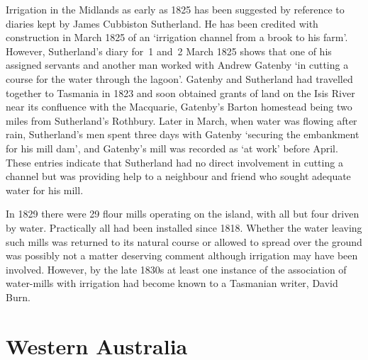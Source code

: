 Irrigation in the Midlands as early as 1825 has been suggested by
reference to diaries kept by James Cubbiston Sutherland. He has been
credited with construction in March 1825 of an `irrigation channel
from a brook to his farm'. However, Sutherland's diary for~1
and~2 March 1825 shows that one of his assigned servants and another
man worked with Andrew Gatenby `in cutting a course for the water
through the lagoon'.  Gatenby and Sutherland had travelled together to
Tasmania in 1823 and soon obtained grants of land on the Isis River
near its confluence with the Macquarie, Gatenby's Barton homestead
being two miles from Sutherland's
Rothbury.  Later in March, when water was flowing after rain,
Sutherland's men spent three days with Gatenby `securing the
embankment for his mill dam', and Gatenby's mill was recorded as `at
work' before April.  These entries indicate that Sutherland had no
direct involvement in cutting a channel but was providing help to a
neighbour and friend who sought adequate water for his
mill.

In 1829 there were 29 flour mills operating on the island, with all
but four driven by water.  Practically all had been installed since
1818.  Whether the water leaving such mills was returned to its
natural course or allowed to spread over the ground was possibly not a
matter deserving comment although irrigation may have been
involved. However, by the late 1830s at least one instance of the
association of water-mills with irrigation had become known to a
Tasmanian writer, David Burn.

\section*{Western Australia}

